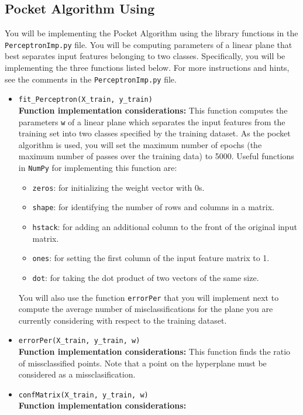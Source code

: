 \documentclass{article}
\theoremstyle{definition}
\begin{document}
\subsection{Pocket Algorithm Using }\label{sec1.a}
You will be implementing the Pocket Algorithm using the  library functions in the \verb|PerceptronImp.py|
file. You will be computing parameters of a linear plane that best separates input features belonging to two
classes. Specifically, you will be implementing the three functions listed below. For more instructions and hints, see the comments in the \verb|PerceptronImp.py|
file.
\begin{itemize}
	\item{\verb|fit_Perceptron(X_train, y_train)|\\\textbf{Function implementation considerations:}
			This function computes the parameters \verb|w| of a linear plane which separates the input features
			from the training set into two classes specified by the training dataset. As the pocket algorithm
			is used, you will set the maximum number of epochs (the maximum number of passes over the
			training data) to 5000. Useful functions in \verb|NumPy| for implementing this function are: 
			\begin{itemize}
				\item \verb|zeros|: for initializing the weight vector with 0s.
				\item \verb|shape|: for identifying the number of rows and columns in a matrix.
				\item \verb|hstack|: for adding an additional column to the front of the original input matrix.
				\item \verb|ones|: for setting the first column of the input feature matrix to 1.
				\item \verb|dot|: for taking the dot product of two vectors of the same size.
			\end{itemize}
			You will also use the function \verb|errorPer|
			that you will implement next to compute the average number of misclassifications for the plane
			you are currently considering with respect to the training dataset.}
		\item{\verb|errorPer(X_train, y_train, w)|\\\textbf{Function implementation considerations:}
			This function finds the ratio of missclassified points. Note that a point on the hyperplane must be considered as a missclasification.}
		\item{\verb|confMatrix(X_train, y_train, w)|\\\textbf{Function implementation considerations:}
}
\end{itemize}
\end{document}
